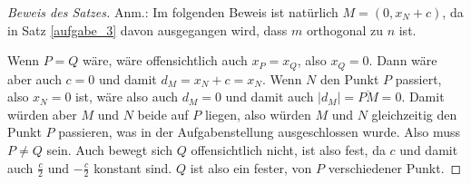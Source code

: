 \begin{proof}[Beweis des Satzes]
    \renewcommand{\qedsymbol}{$\square$}
    Anm.: Im folgenden Beweis ist natürlich $M=(0, x_N+c)$, da in Satz \ref{aufgabe_3} davon ausgegangen wird, dass 
    $m$ orthogonal zu $n$ ist.

    Wenn $P=Q$ wäre, wäre offensichtlich auch $x_P=x_Q$, also $x_Q=0$. Dann wäre aber auch $c=0$ und damit $d_M
    =x_N+c=x_N$. Wenn $N$ den Punkt $P$ passiert, also $x_N=0$ ist, wäre also auch $d_M=0$ und damit auch $|d_M|
    =\overline{PM}=0$. Damit  würden aber $M$ und $N$ beide auf $P$ liegen, also würden $M$ und $N$ gleichzeitig 
    den Punkt $P$ passieren, was in der Aufgabenstellung ausgeschlossen wurde. Also muss $P\neq Q$ sein. Auch bewegt 
    sich $Q$ offensichtlich nicht, ist also fest, da $c$ und damit auch $\frac{c}{2}$ und $-\frac{c}{2}$ konstant sind.
    $Q$ ist also ein fester, von $P$ verschiedener Punkt.
    

\end{proof}
